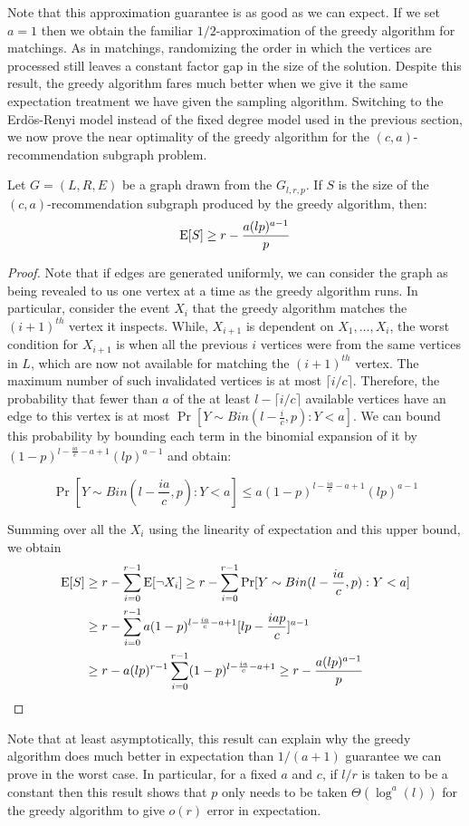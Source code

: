 Note that this approximation guarantee is as good as we can expect.
If we set $a=1$ then we obtain the familiar
$1/2$-approximation of the greedy algorithm for matchings. 
As in matchings, randomizing the order in
which the vertices are processed still leaves a constant factor gap
in the size of the solution\cite{KarpVaziraniVazirani1990}.
Despite this result, the greedy algorithm fares much better when we
give it the same expectation treatment we have given the sampling
algorithm. Switching to the Erd\"{o}s-Renyi model instead of the 
fixed degree model used in the previous section, we now prove the
near optimality of the greedy algorithm for the $(c, a)$-recommendation
subgraph problem.

{
\renewcommand{\qedsymbol}{}
\begin{thm}
Let $G=(L,R,E)$ be a graph drawn from the $G_{l,r,p}$. If $S$ is the size of the $(c,a)$-recommendation subgraph produced by the greedy algorithm, then:
\[ \text{E}[S] \geq r - \frac{a(lp)^{a-1}}{p}\]
\end{thm}
\begin{proof}
Note that if edges are generated uniformly, we can consider the
graph as being revealed to us one vertex at a time as the greedy
algorithm runs. In particular, consider the event $X_i$ that the
greedy algorithm matches the $(i+1)^{th}$ vertex it inspects. While,
$X_{i+1}$ is dependent on $X_1,\ldots, X_i$, the worst condition for
$X_{i+1}$ is when all the previous $i$ vertices were from the same
vertices in $L$, which are now not available for matching the
$(i+1)^{th}$ vertex. The maximum number of such invalidated vertices
is at most $\lceil i/c \rceil$. Therefore, the probability that fewer
than $a$ of the at least $l-\lceil i/c \rceil $ available 
vertices have an edge to this vertex is at most $\Pr[Y\sim Bin(l-\frac{i}{c},p): Y < a]$.
We can bound this probability by bounding each term in the binomial
expansion of it by $(1-p)^{l-\frac{ia}{c}-a+1}(lp)^{a-1}$ and obtain:

\[ \Pr[Y\sim Bin(l-\frac{ia}{c},p): Y < a] \leq a(1-p)^{l-\frac{ia}{c}-a+1}(lp)^{a-1}\]

Summing over all the $X_i$ using the linearity of expectation and this upper bound,
we obtain
\begin{align*}
      \text{E}[S]
&\geq r - \sum_{i=0}^{r-1} \text{E}[\lnot X_i] \geq r - \sum_{i=0}^{r-1} \Pr[Y \sim Bin(l-\frac{ia}{c},p): Y < a] \\
&\geq r - \sum_{i=0}^{r-1}a(1-p)^{l-\frac{ia}{c}-a+1}[lp-\frac{iap}{c}]^{a-1} \\
&\geq r - a(lp)^{r-1}\sum_{i=0}^{r-1}(1-p)^{l-\frac{ia}{c}-a+1} \geq r - \frac{a(lp)^{a-1}}{p}
\end{align*}
\end{proof} 
}

Note that at least asymptotically, this result can explain why the greedy
algorithm does much better in expectation than $1/(a+1)$ guarantee we 
can prove in the worst case. In particular, for a fixed $a$ and $c$, if
$l/r$ is taken to be a constant then this result shows that $p$ only
needs to be taken $\Theta(\log^{a}(l))$ for the greedy algorithm to
give $o(r)$ error in expectation. 
